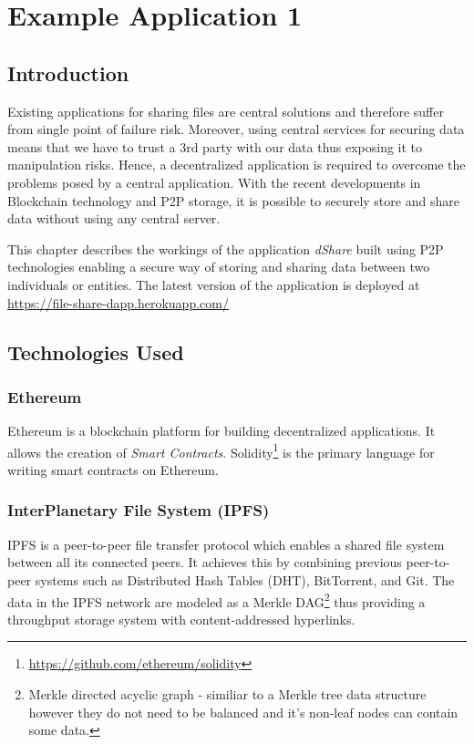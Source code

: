 \chapter{Example Application 1}\label{chapter:poc1}

\section{Introduction}
Existing applications for sharing files are central solutions and therefore suffer from single point of failure risk. Moreover, using central services for securing data means that we have to trust a 3rd party with our data thus exposing it to manipulation risks. Hence, a decentralized
application is required to overcome the problems posed by a central application. With the recent developments in Blockchain technology and P2P storage, it is possible to securely store and share data without using any central server.

This chapter describes the workings of the application \textit{dShare}\cite{harsh_kedia_2019_3359852} built using P2P technologies enabling a secure way of storing and sharing data between two individuals or entities. The latest version of the application is deployed at \url{https://file-share-dapp.herokuapp.com/}

\section{Technologies Used}

\subsection{Ethereum}
Ethereum\cite{buterin2014ethereum} is a blockchain platform for building decentralized applications. It allows the creation of \textit{Smart Contracts}. Solidity\footnote{\url{https://github.com/ethereum/solidity}} is the primary language for writing smart contracts on Ethereum.

\subsection{InterPlanetary File System (IPFS)}
IPFS\cite{benet2014ipfs} is a peer-to-peer file transfer protocol which enables a shared file system between all its connected peers. It achieves this by combining previous peer-to-peer systems such as Distributed Hash Tables (DHT), BitTorrent\cite{cohen2008bittorrent}, and Git\cite{loeliger2012version}. The data in the IPFS network are modeled as a Merkle DAG\footnote{Merkle directed acyclic graph - similiar to a Merkle tree data structure however they do not need to be balanced and it’s non-leaf nodes can contain some data.} thus providing a throughput storage system with content-addressed hyperlinks.

